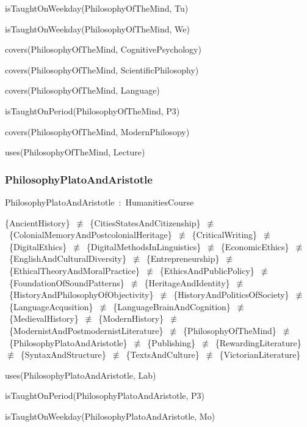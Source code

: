 \documentclass{article}
\begin{document}
isTaughtOnWeekday(PhilosophyOfTheMind, Tu)

isTaughtOnWeekday(PhilosophyOfTheMind, We)

covers(PhilosophyOfTheMind, CognitivePsychology)

covers(PhilosophyOfTheMind, ScientificPhilosophy)

covers(PhilosophyOfTheMind, Language)

isTaughtOnPeriod(PhilosophyOfTheMind, P3)

covers(PhilosophyOfTheMind, ModernPhilosopy)

uses(PhilosophyOfTheMind, Lecture)

\subsubsection*{PhilosophyPlatoAndAristotle}

PhilosophyPlatoAndAristotle~:~HumanitiesCourse

\{AncientHistory\}~\ensuremath{\not\equiv}~\{CitiesStatesAndCitizenship\}~\ensuremath{\not\equiv}~\{ColonialMemoryAndPostcolonialHeritage\}~\ensuremath{\not\equiv}~\{CriticalWriting\}~\ensuremath{\not\equiv}~\{DigitalEthics\}~\ensuremath{\not\equiv}~\{DigitalMethodsInLinguistics\}~\ensuremath{\not\equiv}~\{EconomicEthics\}~\ensuremath{\not\equiv}~\{EnglishAndCulturalDiversity\}~\ensuremath{\not\equiv}~\{Entrepreneurship\}~\ensuremath{\not\equiv}~\{EthicalTheoryAndMoralPractice\}~\ensuremath{\not\equiv}~\{EthicsAndPublicPolicy\}~\ensuremath{\not\equiv}~\{FoundationOfSoundPatterns\}~\ensuremath{\not\equiv}~\{HeritageAndIdentity\}~\ensuremath{\not\equiv}~\{HistoryAndPhilosophyOfObjectivity\}~\ensuremath{\not\equiv}~\{HistoryAndPoliticsOfSociety\}~\ensuremath{\not\equiv}~\{LanguageAcqusition\}~\ensuremath{\not\equiv}~\{LanguageBrainAndCognition\}~\ensuremath{\not\equiv}~\{MedievalHistory\}~\ensuremath{\not\equiv}~\{ModernHistory\}~\ensuremath{\not\equiv}~\{ModernistAndPostmodernistLiterature\}~\ensuremath{\not\equiv}~\{PhilosophyOfTheMind\}~\ensuremath{\not\equiv}~\{PhilosophyPlatoAndAristotle\}~\ensuremath{\not\equiv}~\{Publishing\}~\ensuremath{\not\equiv}~\{RewardingLiterature\}~\ensuremath{\not\equiv}~\{SyntaxAndStructure\}~\ensuremath{\not\equiv}~\{TextsAndCulture\}~\ensuremath{\not\equiv}~\{VictorianLiterature\}

uses(PhilosophyPlatoAndAristotle, Lab)

isTaughtOnPeriod(PhilosophyPlatoAndAristotle, P3)

isTaughtOnWeekday(PhilosophyPlatoAndAristotle, Mo)
\end{document}
